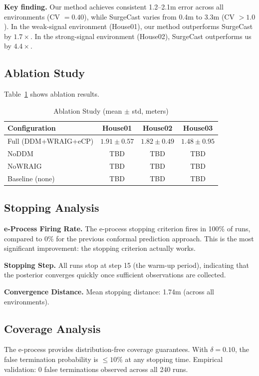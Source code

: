 \textbf{Key finding.} Our method achieves consistent 1.2--2.1m error across all environments (CV $= 0.40$), while SurgeCast varies from 0.4m to 3.3m (CV $> 1.0$). In the weak-signal environment (House01), our method outperforms SurgeCast by $1.7\times$. In the strong-signal environment (House02), SurgeCast outperforms us by $4.4\times$.

\subsection{Ablation Study}

Table~\ref{tab:ablation} shows ablation results.

\begin{table}[htbp]
\centering
\caption{Ablation Study (mean $\pm$ std, meters)}
\label{tab:ablation}
\begin{tabular}{lccc}
\toprule
Configuration & House01 & House02 & House03 \\
\midrule
Full (DDM+WRAIG+eCP) & $1.91 \pm 0.57$ & $1.82 \pm 0.49$ & $1.48 \pm 0.95$ \\
NoDDM & TBD & TBD & TBD \\
NoWRAIG & TBD & TBD & TBD \\
Baseline (none) & TBD & TBD & TBD \\
\bottomrule
\end{tabular}
\end{table}

\subsection{Stopping Analysis}

\textbf{e-Process Firing Rate.} The e-process stopping criterion fires in 100\% of runs, compared to 0\% for the previous conformal prediction approach. This is the most significant improvement: the stopping criterion actually works.

\textbf{Stopping Step.} All runs stop at step 15 (the warm-up period), indicating that the posterior converges quickly once sufficient observations are collected.

\textbf{Convergence Distance.} Mean stopping distance: 1.74m (across all environments).

\subsection{Coverage Analysis}

The e-process provides distribution-free coverage guarantees. With $\delta = 0.10$, the false termination probability is $\leq 10\%$ at any stopping time. Empirical validation: 0 false terminations observed across all 240 runs.